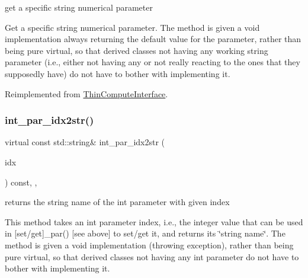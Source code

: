 get a specific string numerical parameter 

Get a specific string numerical parameter. The method is given a void implementation always returning the default value for the parameter, rather than being pure virtual, so that derived classes not having any working string parameter (i.\+e., either not having any or not really reacting to the ones that they supposedly have) do not have to bother with implementing it. 

Reimplemented from \mbox{\hyperlink{class_s_m_spp__di__unipi__it_1_1_thin_compute_interface_abdd41940763ebff749e5f16e6ea310c6}{Thin\+Compute\+Interface}}.

\mbox{\label{class_s_m_spp__di__unipi__it_1_1_f_real_objective_a61e973f39747f63b8f56d97cc62e32ce}} 
\subsubsection{\texorpdfstring{int\+\_\+par\+\_\+idx2str()}{int\_par\_idx2str()}}
{\footnotesize\ttfamily virtual const std\+::string\& int\+\_\+par\+\_\+idx2str (\begin{DoxyParamCaption}\item[{const \mbox{\hyperlink{class_s_m_spp__di__unipi__it_1_1_thin_compute_interface_aa3d710629ad8c434286726ad810c3b47}{idx\+\_\+type}}}]{idx }\end{DoxyParamCaption}) const\hspace{0.3cm}{\ttfamily [inline]}, {\ttfamily [override]}, {\ttfamily [virtual]}}



returns the string name of the int parameter with given index 

This method takes an int parameter index, i.\+e., the integer value that can be used in \mbox{[}set/get\mbox{]}\+\_\+par() \mbox{[}see above\mbox{]} to set/get it, and returns its \char`\"{}string name\char`\"{}. The method is given a void implementation (throwing exception), rather than being pure virtual, so that derived classes not having any int parameter do not have to bother with implementing it. 

